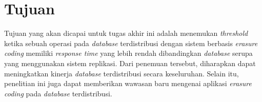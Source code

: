 \section{Tujuan}

Tujuan yang akan dicapai untuk tugas akhir ini adalah menemukan \textit{threshold} ketika sebuah operasi pada \textit{database} terdistribusi dengan sistem berbasis \textit{erasure coding} memiliki \textit{response time} yang lebih rendah dibandingkan \textit{database} serupa yang menggunakan sistem replikasi. Dari penemuan tersebut, diharapkan dapat meningkatkan kinerja \textit{database} terdistribusi secara keseluruhan. Selain itu, penelitian ini juga dapat memberikan wawasan baru mengenai aplikasi \textit{erasure coding} pada \textit{database} terdistribusi.
